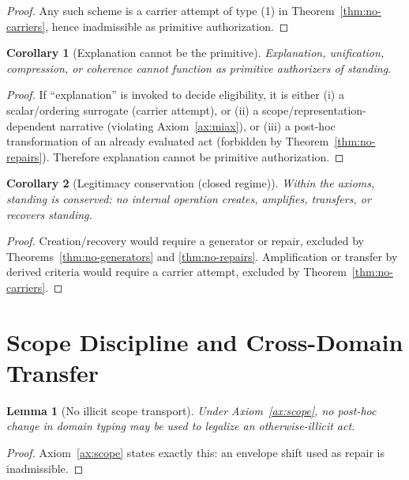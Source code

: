 \documentclass[12pt]{article}
\newtheorem{lemma}{Lemma}
\newtheorem{corollary}{Corollary}
\begin{document}
\begin{proof}
Any such scheme is a carrier attempt of type (1) in Theorem~\ref{thm:no-carriers}, hence inadmissible as primitive authorization.
\end{proof}

\begin{corollary}[Explanation cannot be the primitive]
\label{cor:explain}
Explanation, unification, compression, or coherence cannot function as primitive authorizers of standing.
\end{corollary}

\begin{proof}
If ``explanation'' is invoked to decide eligibility, it is either (i) a scalar/ordering surrogate (carrier attempt), or (ii) a scope/representation-dependent narrative (violating Axiom~\ref{ax:miax}),
or (iii) a post-hoc transformation of an already evaluated act (forbidden by Theorem~\ref{thm:no-repairs}). Therefore explanation cannot be primitive authorization.
\end{proof}

\begin{corollary}[Legitimacy conservation (closed regime)]
\label{cor:conservation}
Within the axioms, standing is conserved: no internal operation creates, amplifies, transfers, or recovers standing.
\end{corollary}

\begin{proof}
Creation/recovery would require a generator or repair, excluded by Theorems~\ref{thm:no-generators} and \ref{thm:no-repairs}.
Amplification or transfer by derived criteria would require a carrier attempt, excluded by Theorem~\ref{thm:no-carriers}.
\end{proof}

\section{Scope Discipline and Cross-Domain Transfer}
\label{sec:transfer}

\begin{lemma}[No illicit scope transport]
\label{lem:no-scope-transport}
Under Axiom~\ref{ax:scope}, no post-hoc change in domain typing may be used to legalize an otherwise-illicit act.
\end{lemma}

\begin{proof}
Axiom~\ref{ax:scope} states exactly this: an envelope shift used as repair is inadmissible. \end{proof}
\end{document}
